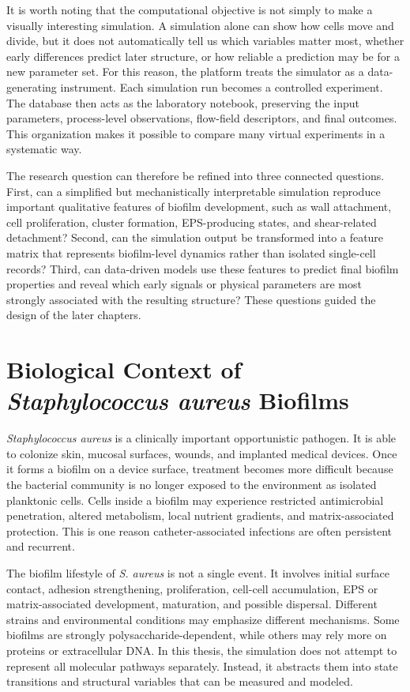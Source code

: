 \documentclass[12pt,a4paper,oneside]{report}
\begin{document}
It is worth noting that the computational objective is not simply to make a visually interesting simulation. A simulation alone can show how cells move and divide, but it does not automatically tell us which variables matter most, whether early differences predict later structure, or how reliable a prediction may be for a new parameter set. For this reason, the platform treats the simulator as a data-generating instrument. Each simulation run becomes a controlled experiment. The database then acts as the laboratory notebook, preserving the input parameters, process-level observations, flow-field descriptors, and final outcomes. This organization makes it possible to compare many virtual experiments in a systematic way.

The research question can therefore be refined into three connected questions. First, can a simplified but mechanistically interpretable simulation reproduce important qualitative features of biofilm development, such as wall attachment, cell proliferation, cluster formation, EPS-producing states, and shear-related detachment? Second, can the simulation output be transformed into a feature matrix that represents biofilm-level dynamics rather than isolated single-cell records? Third, can data-driven models use these features to predict final biofilm properties and reveal which early signals or physical parameters are most strongly associated with the resulting structure? These questions guided the design of the later chapters.


\section{Biological Context of \textit{Staphylococcus aureus} Biofilms}
\textit{Staphylococcus aureus} is a clinically important opportunistic pathogen. It is able to colonize skin, mucosal surfaces, wounds, and implanted medical devices. Once it forms a biofilm on a device surface, treatment becomes more difficult because the bacterial community is no longer exposed to the environment as isolated planktonic cells. Cells inside a biofilm may experience restricted antimicrobial penetration, altered metabolism, local nutrient gradients, and matrix-associated protection. This is one reason catheter-associated infections are often persistent and recurrent.

The biofilm lifestyle of \textit{S. aureus} is not a single event. It involves initial surface contact, adhesion strengthening, proliferation, cell-cell accumulation, EPS or matrix-associated development, maturation, and possible dispersal. Different strains and environmental conditions may emphasize different mechanisms. Some biofilms are strongly polysaccharide-dependent, while others may rely more on proteins or extracellular DNA. In this thesis, the simulation does not attempt to represent all molecular pathways separately. Instead, it abstracts them into state transitions and structural variables that can be measured and modeled.
\end{document}
